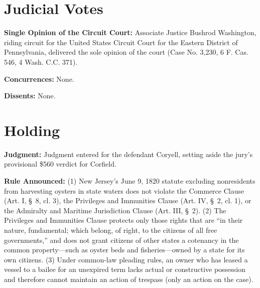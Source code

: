 \documentclass[12pt]{article}
\begin{document}
\section{Judicial Votes}

\textbf{Single Opinion of the Circuit Court:} Associate Justice Bushrod Washington, riding circuit for the United States Circuit Court for the Eastern District of Pennsylvania, delivered the sole opinion of the court (Case No. 3,230, 6 F. Cas. 546, 4 Wash. C.C. 371).

\textbf{Concurrences:} None.

\textbf{Dissents:} None.

\section{Holding}

\textbf{Judgment:} Judgment entered for the defendant Coryell, setting aside the jury's provisional \$560 verdict for Corfield.

\textbf{Rule Announced:} (1) New Jersey's June 9, 1820 statute excluding nonresidents from harvesting oysters in state waters does not violate the Commerce Clause (Art. I, \S\ 8, cl. 3), the Privileges and Immunities Clause (Art. IV, \S\ 2, cl. 1), or the Admiralty and Maritime Jurisdiction Clause (Art. III, \S\ 2). (2) The Privileges and Immunities Clause protects only those rights that are ``in their nature, fundamental; which belong, of right, to the citizens of all free governments,'' and does not grant citizens of other states a cotenancy in the common property---such as oyster beds and fisheries---owned by a state for its own citizens. (3) Under common-law pleading rules, an owner who has leased a vessel to a bailee for an unexpired term lacks actual or constructive possession and therefore cannot maintain an action of trespass (only an action on the case).
\end{document}
